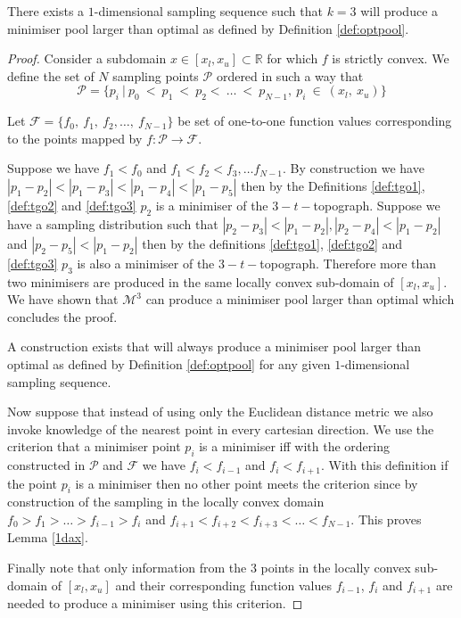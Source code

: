 \begin{theorem} \label{1d}
There exists a $1$-dimensional sampling sequence such that $k = 3$ will produce a minimiser pool larger than optimal as defined by Definition \ref{def:optpool}.
\end{theorem}

\begin{proof}
Consider a subdomain $x \in [x_l, x_u] \subset \mathbb{R}$ for which $f$ is strictly convex. We define the set of $N$ sampling points $\mathcal{P}$ ordered in such a way that $$\mathcal{P} = \{p_i~|~p_{0}~<~p_{1}~<~p_{2}<~\dots~<~p_{N-1},~p_{i}~\in~(x_l,~x_u)\}$$

Let $\mathcal{F} = \{f_{0},~f_{1},~f_{2},\dots,~f_{N-1}\}$ be set of one-to-one function values corresponding to the points mapped by $f:\mathcal{P} \rightarrow \mathcal{F}$. 

Suppose we have $f_1 < f_0$ and $f_1 < f_2 < f_3, \dots f_{N-1}$.  %
By construction we have  $|p_1 - p_2| < |p_1 - p_3| < |p_1 - p_4| < |p_1 - p_5|$ then by the Definitions \ref{def:tgo1}, \ref{def:tgo2} and \ref{def:tgo3} $p_2$ is a minimiser of the $3-t-$topograph. Suppose we have a sampling distribution such that $|p_2 - p_3| < |p_1 - p_2|, |p_2 - p_4| < |p_1 - p_2|$ and $|p_2 - p_5| < |p_1 - p_2|$ then by the definitions \ref{def:tgo1}, \ref{def:tgo2} and \ref{def:tgo3} $p_3$ is also a minimiser of the $3-t-$topograph. Therefore more than two minimisers are produced in the same locally convex sub-domain of $[x_l, x_u]$. We have shown that $\mathcal{M}^3$ can produce a minimiser pool larger than optimal which concludes the proof.

\begin{lemma} \label{1dax}
A construction exists that will always produce a minimiser pool larger than optimal as defined by Definition \ref{def:optpool} for any given $1$-dimensional sampling sequence.
\end{lemma}

Now suppose that instead of using only the Euclidean distance metric we also invoke knowledge of the nearest point in every cartesian direction. We use the criterion that a minimiser point $p_i$ is a minimiser iff \normalfont with the ordering constructed in $\mathcal{P}$ and $\mathcal{F}$ we have $f_i < f_{i - 1}$ and $f_i < f_{i + 1}$. With this definition if the point $p_i$ is a minimiser then no other point meets the criterion since by construction of the sampling in the locally convex domain $f_{0} > f_{1} > \dots > f_{i - 1} > f_i$ and $f_{i + 1} < f_{i + 2} < f_{i + 3} < \dots < f_{N-1}$. This proves Lemma \ref{1dax}. 

Finally note that only information from the 3 points in the locally convex sub-domain of $[x_l, x_u]$ and their corresponding function values $f_{i - 1}$, $f_{i}$ and $f_{i + 1}$ are needed to produce a minimiser using this criterion.
\end{proof}

